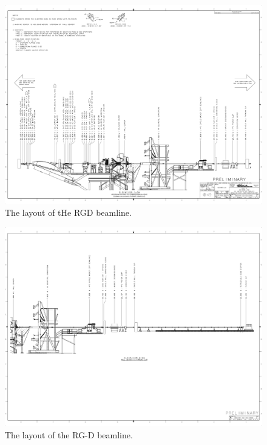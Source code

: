 \documentclass[11pt]{article}
\begin{document}
{\begin{figure}[hbt]
\vspace{-2cm}
\begin{center}
\includegraphics[width=9in,angle=90]{RGD_beamline_p1.pdf}
\caption{ \label{fig:beamline1} The layout of tHe RGD beamline. }
\end{center}
\end{figure}

\begin{figure}[hbt]
\vspace{-2cm}
\begin{center}
\includegraphics[width=9in,angle=90]{RGD_beamline_p2.pdf}
\end{center}
\caption{ \label{fig:beamline2} 
The layout of the RG-D beamline. }
\end{figure}

}
\end{document}
